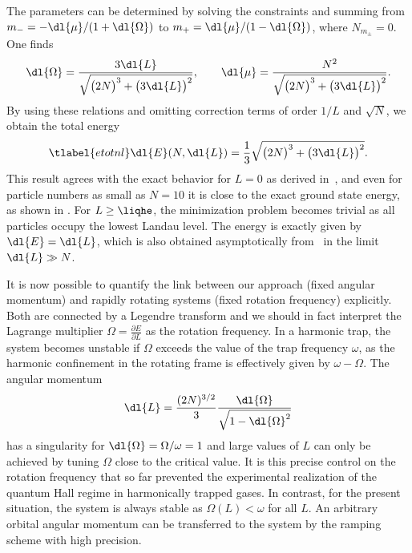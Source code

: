 The parameters can be determined by solving the constraints and summing from $m_-=-\dl{\mu}/(1+\dl{\Omega})$ to $m_+=\dl{\mu}/(1-\dl{\Omega})$, where $N_{m_\pm}=0$. One finds
\begin{align}
\dl{\Omega} = \frac{3 \dl{L}}{\sqrt{\big(2N\big)^3 + \big(3\dl{L}\big)^2}}, \qquad \dl{\mu}= \frac{N^2}{\sqrt{\big(2N\big)^3 + \big(3\dl{L}\big)^2}}.
\end{align}
By using these relations and omitting correction terms of order $1/L$ and $\sqrt{N}$, we obtain the total energy
\begin{align} \tlabel{etotnl}
\dl{E}(N,\dl{L})= \frac{1}{3} \sqrt{\big(2N\big)^3 + \big(3\dl{L}\big)^2}.
\end{align}
This result agrees with the exact behavior for $L=0$ as derived in~, and even for particle numbers as small as $N=10$ it is close to the exact ground state energy, as shown in . For $L\ge\liqhe$, the minimization problem becomes trivial as all particles occupy the lowest Landau level. The energy is exactly given by $\dl{E}=\dl{L}$, which is also obtained asymptotically from~ in the limit $\dl{L}\gg N$.

It is now possible to quantify the link between our approach (fixed angular momentum) and rapidly rotating systems (fixed rotation frequency) explicitly. Both are connected by a Legendre transform and we should in fact interpret the Lagrange multiplier $\Omega=\frac{\partial E}{\partial L}$
as the rotation frequency. In a harmonic trap, the system becomes unstable if $\Omega$ exceeds the value of the trap frequency $\omega$, as the harmonic confinement in the rotating frame is effectively given by $\omega-\Omega$. The angular momentum
\begin{align}
\dl{L}=\frac{(2N)^{3/2}}{3} \frac{\dl{\Omega}}{\sqrt{1-\dl{\Omega}^2}}
\end{align}
has a singularity for $\dl{\Omega}=\Omega/\omega=1$ and large values of $L$ can only be achieved by tuning $\Omega$ close to the critical value. It is this precise control on the rotation frequency that so far prevented the experimental realization of the quantum Hall regime in harmonically trapped gases. In contrast, for the present situation, the system is always stable as $\Omega(L)<\omega$ for all $L$. An arbitrary orbital angular momentum can be transferred to the system by the ramping scheme with high precision.




